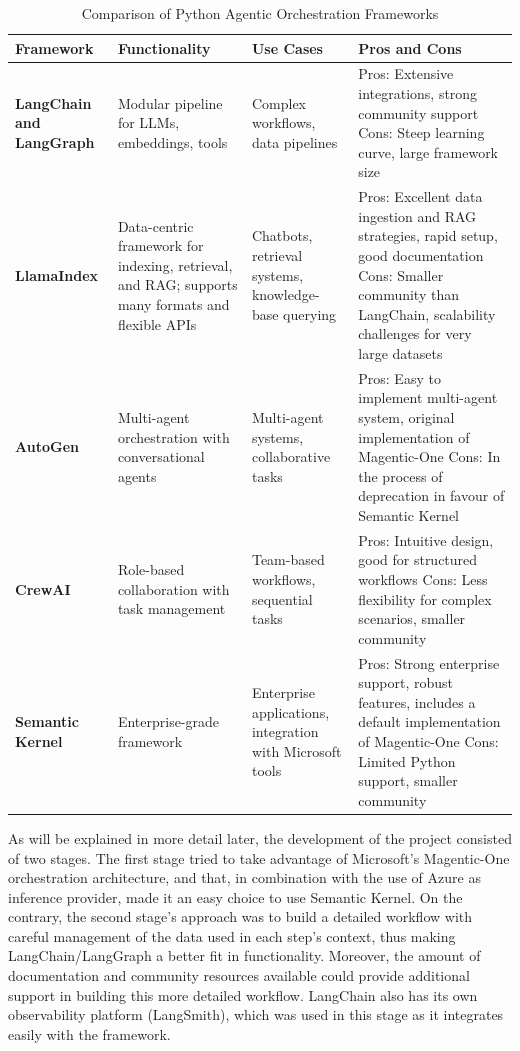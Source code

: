 \documentclass[a4paper]{report}
\begin{document}
\begin{table}[h]
\centering
\begin{tabular}{|p{3cm}|p{3cm}|p{2.5cm}|p{5.5cm}|}
    \hline
    \textbf{Framework} & \textbf{Functionality} & \textbf{Use Cases} & \textbf{Pros and Cons} \\ \hline
    \textbf{LangChain and \newline LangGraph} & Modular pipeline for LLMs, embeddings, tools & Complex workflows, data pipelines & Pros: Extensive integrations, strong community support \newline Cons: Steep learning curve, large framework size \\ \hline
    \textbf{LlamaIndex} & Data-centric framework for indexing, retrieval, and RAG; supports many formats and flexible APIs & Chatbots, retrieval systems, knowledge-base querying & Pros: Excellent data ingestion and RAG strategies, rapid setup, good documentation \newline Cons: Smaller community than LangChain, scalability challenges for very large datasets \\ \hline
    \textbf{AutoGen} & Multi-agent orchestration with conversational agents & Multi-agent systems, collaborative tasks & Pros: Easy to implement multi-agent system, original implementation of Magentic-One \newline Cons: In the process of deprecation in favour of Semantic Kernel \\
    \hline
    \textbf{CrewAI} & Role-based collaboration with task management & Team-based workflows, sequential tasks & Pros: Intuitive design, good for structured workflows \newline Cons: Less flexibility for complex scenarios, smaller community \\
    \hline
    \textbf{Semantic Kernel} & Enterprise-grade framework & Enterprise applications, integration with Microsoft tools & Pros: Strong enterprise support, robust features, includes a default implementation of Magentic-One \newline Cons: Limited Python support, smaller community \\
    \hline
\end{tabular}
\caption{Comparison of Python Agentic Orchestration Frameworks}
\label{tab:orchestration_frameworks_uses}
\end{table}

As will be explained in more detail later, the development of the project consisted of two stages. The first stage tried to take advantage of Microsoft's Magentic-One orchestration architecture, and that, in combination with the use of Azure as inference provider, made it an easy choice to use Semantic Kernel. On the contrary, the second stage's approach was to build a detailed workflow with careful management of the data used in each step's context, thus making LangChain/LangGraph a better fit in functionality. Moreover, the amount of documentation and community resources available could provide additional support in building this more detailed workflow. LangChain also has its own observability platform (LangSmith), which was used in this stage as it integrates easily with the framework.
\end{document}

